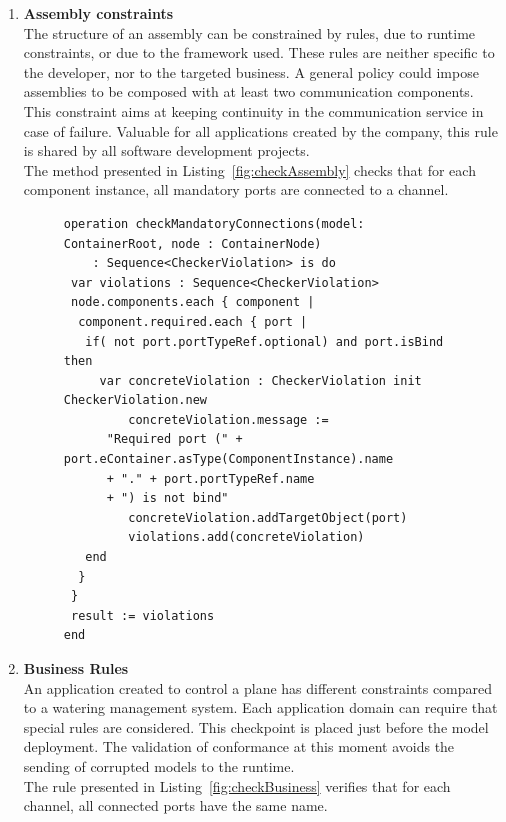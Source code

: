 \begin{enumerate}
\item {\bf Assembly constraints}\\
The structure of an assembly can be constrained by rules, due to runtime constraints, or due to the framework used. These rules are neither specific to the developer, nor to the targeted business. A general policy could impose assemblies to be composed with at least two communication components. This constraint aims at keeping continuity in the communication service in case of failure. Valuable for all applications created by the company, this rule is shared by all software development projects.\\
The method presented in Listing~\ref{fig:checkAssembly} checks that for each component instance, all mandatory ports are connected to a channel.

\begin{figure}[h!]
\centering
\begin{lstlisting}[caption=Example checking assembly constraints,label=fig:checkAssembly,basicstyle=\scriptsize\ttfamily,tabsize=1 ]
operation checkMandatoryConnections(model: ContainerRoot, node : ContainerNode)
	: Sequence<CheckerViolation> is do
 var violations : Sequence<CheckerViolation>
 node.components.each { component |
  component.required.each { port |
   if( not port.portTypeRef.optional) and port.isBind then
     var concreteViolation : CheckerViolation init CheckerViolation.new
    	 concreteViolation.message :=
      "Required port (" + port.eContainer.asType(ComponentInstance).name
      + "." + port.portTypeRef.name
      + ") is not bind"
    	 concreteViolation.addTargetObject(port)
    	 violations.add(concreteViolation)
   end
  }
 }
 result := violations
end
\end{lstlisting} 
\vspace{-0,3cm}
\end{figure}


\item {\bf Business Rules}\\
An application created to control a plane has different constraints compared to a watering management system. Each application domain can require that special rules are considered. This checkpoint is placed just before the model deployment. The validation of conformance at this moment avoids the sending of corrupted models to the runtime.\\
The rule presented in Listing~\ref{fig:checkBusiness} verifies that for each channel, all connected ports have the same name.


\end{enumerate}
